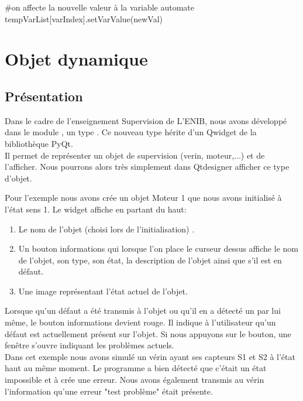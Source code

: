{\begin{Python}
	#on affecte la nouvelle valeur à la variable automate
	tempVarList[varIndex].setVarValue(newVal)
		
\end{Python}
\chapter{Objet dynamique}

\section{Présentation}

Dans le cadre de l'enseignement Supervision de L'ENIB, nous avons développé dans le module , un type . Ce nouveau type hérite d'un Qwidget de la bibliothèque PyQt.\\

Il permet de représenter un objet de supervision (verin, moteur,...) et de l'afficher. Nous pourrons alors très simplement dans Qtdesigner afficher ce type d'objet.\\ 


Pour l'exemple nous avons crée un objet Moteur 1 que nous avons initialisé à l'état sens 1. 
Le widget affiche en partant du haut:
\begin{enumerate}
    \item Le nom de l'objet (choisi lors de l'initialisation) .
    \item Un bouton informations qui lorsque l'on place le curseur dessus affiche le nom de l'objet, son type, son état, la description de l'objet ainsi que s'il est en défaut.
    \item Une image représentant l'état actuel de l'objet.
\end{enumerate}


Lorsque qu'un défaut a été transmis à l'objet ou qu'il en a détecté un par lui même, le bouton informations devient rouge. Il indique à l'utilisateur qu'un défaut est actuellement présent sur l'objet. Si nous appuyons sur le bouton, une fenêtre s'ouvre indiquant les problèmes actuels. \\

Dans cet exemple nous avons simulé un vérin ayant ses capteurs S1 et S2 à l'état haut au même moment. Le programme a bien détecté que c'était un état impossible et à crée une erreur. Nous avons également transmis au vérin l'information qu'une erreur "test problème" était présente. 
 
}
